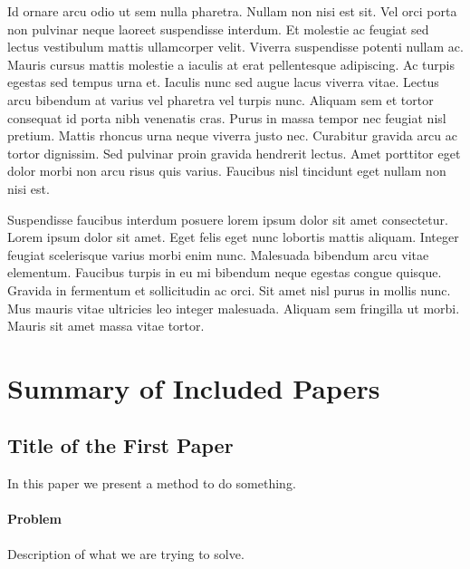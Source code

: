Id ornare arcu odio ut sem nulla pharetra. Nullam non nisi est sit. Vel orci porta non pulvinar neque laoreet suspendisse interdum. Et molestie ac feugiat sed lectus vestibulum mattis ullamcorper velit. Viverra suspendisse potenti nullam ac. Mauris cursus mattis molestie a iaculis at erat pellentesque adipiscing. Ac turpis egestas sed tempus urna et. Iaculis nunc sed augue lacus viverra vitae. Lectus arcu bibendum at varius vel pharetra vel turpis nunc. Aliquam sem et tortor consequat id porta nibh venenatis cras. Purus in massa tempor nec feugiat nisl pretium. Mattis rhoncus urna neque viverra justo nec. Curabitur gravida arcu ac tortor dignissim. Sed pulvinar proin gravida hendrerit lectus. Amet porttitor eget dolor morbi non arcu risus quis varius. Faucibus nisl tincidunt eget nullam non nisi est.

Suspendisse faucibus interdum posuere lorem ipsum dolor sit amet consectetur. Lorem ipsum dolor sit amet. Eget felis eget nunc lobortis mattis aliquam. Integer feugiat scelerisque varius morbi enim nunc. Malesuada bibendum arcu vitae elementum. Faucibus turpis in eu mi bibendum neque egestas congue quisque. Gravida in fermentum et sollicitudin ac orci. Sit amet nisl purus in mollis nunc. Mus mauris vitae ultricies leo integer malesuada. Aliquam sem fringilla ut morbi. Mauris sit amet massa vitae tortor.


\chapter{Summary of Included Papers}
\label{chap:summary}

\section{Title of the First Paper}

In this paper we present a method to do something.

\subsubsection*{Problem}

Description of what we are trying to solve.

